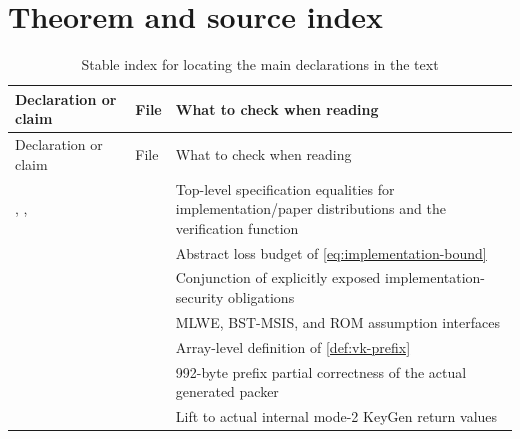 \section{Theorem and source index}
\label{sec:source-index}

\begingroup
\footnotesize
\renewcommand{\arraystretch}{1.08}
\begin{longtable}{L{0.29\textwidth}L{0.31\textwidth}L{0.32\textwidth}}
\caption{Stable index for locating the main declarations in the text}\label{tab:source-index}\\
\toprule
Declaration or claim & File & What to check when reading \\
\midrule
\endfirsthead
\toprule
Declaration or claim & File & What to check when reading \\
\midrule
\endhead
{}, ,  &
 & Top-level specification equalities for implementation/paper distributions and the verification function \\
\newline{} &
 & Abstract loss budget of \cref{eq:implementation-bound} \\
 &
\newline
{}\newline{} & Conjunction of explicitly exposed implementation-security obligations \\
 &
 & MLWE, BST-MSIS, and ROM assumption interfaces \\
 &
 & Array-level definition of \cref{def:vk-prefix} \\
 &
\newline
{}\newline{} & 992-byte prefix partial correctness of the actual generated packer \\
 &
\newline
{}\newline{} & Lift to actual internal mode-2 KeyGen return values \\

\end{longtable}
